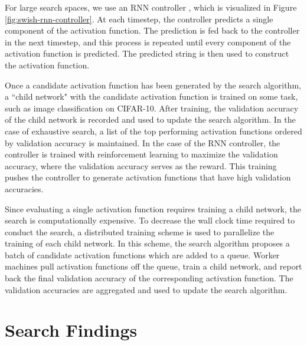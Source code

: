 \documentclass{article} %
\begin{document}
For large search spaces, we use an RNN controller \citep{zoph2016neural}, which is visualized in Figure \ref{fig:swish-rnn-controller}. At each timestep, the controller predicts a single component of the activation function. The prediction is fed back to the controller in the next timestep, and this process is repeated until every component of the activation function is predicted. The predicted string is then used to construct the activation function.

Once a candidate activation function has been generated by the search algorithm, a ``child network" with the candidate activation function is trained on some task, such as image classification on CIFAR-10. After training, the validation accuracy of the child network is recorded and used to update the search algorithm. In the case of exhaustive search, a list of the top performing activation functions ordered by validation accuracy is maintained. In the case of the RNN controller, the controller is trained with reinforcement learning to maximize the validation accuracy, where the validation accuracy serves as the reward. This training pushes the controller to generate activation functions that have high validation accuracies. 

Since evaluating a single activation function requires training a child network, the search is computationally expensive. To decrease the wall clock time required to conduct the search, a distributed training scheme is used to parallelize the training of each child network. In this scheme, the search algorithm proposes a batch of candidate activation functions which are added to a queue. Worker machines pull activation functions off the queue, train a child network, and report back the final validation accuracy of the corresponding activation function. The validation accuracies are aggregated and used to update the search algorithm.


\section{Search Findings}
\label{sec:findings}
\end{document}
